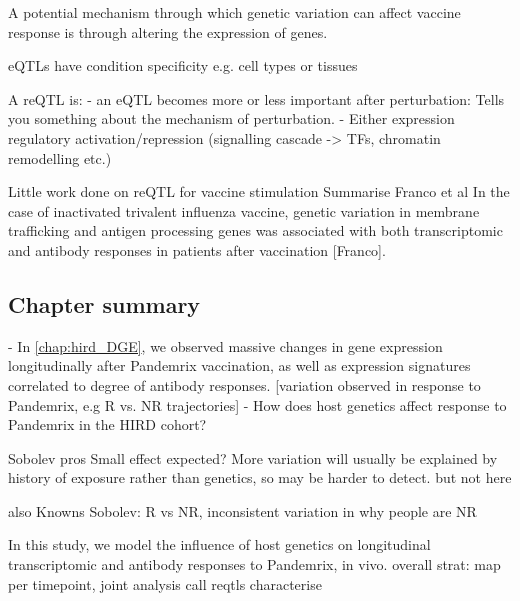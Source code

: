 A potential mechanism through which genetic variation can affect vaccine response is through altering the expression of genes.

eQTLs have condition specificity
e.g. cell types or tissues

A reQTL is: \autocite{vandiedonck2017GeneticAssociationMolecular}
- an eQTL becomes more or less important after perturbation: Tells you something about the mechanism of perturbation.
- Either expression regulatory activation/repression (signalling cascade -> TFs, chromatin remodelling etc.)

Little work done on reQTL for vaccine stimulation
Summarise Franco et al
In the case of inactivated trivalent influenza vaccine, genetic variation in membrane trafficking and antigen processing genes was associated with both transcriptomic and antibody responses in patients after vaccination [Franco].

\subsection{Chapter summary}


- In \autoref{chap:hird_DGE}, we observed massive changes in gene expression longitudinally after Pandemrix vaccination, as well as expression signatures correlated to degree of antibody responses.
[variation observed in response to Pandemrix, e.g R vs. NR trajectories]
- How does host genetics affect response to Pandemrix in the HIRD cohort?

Sobolev pros
    Small effect expected?
    More variation will usually be explained by history of exposure rather than genetics, so may be harder to detect.
    but not here

also Knowns
    Sobolev: R vs NR, 
    inconsistent variation in why people are NR

In this study, we model the influence of host genetics on longitudinal transcriptomic and antibody responses to Pandemrix, in vivo.
    overall strat: map per timepoint, joint analysis
    call reqtls
    characterise

